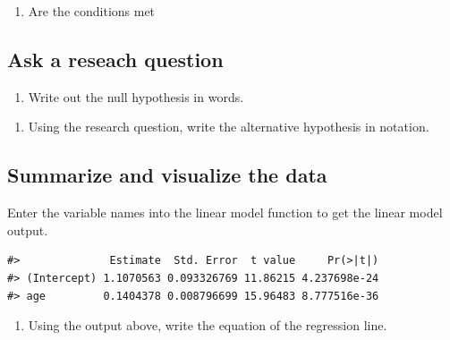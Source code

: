 \documentclass[
]{report}
\providecommand{\tightlist}{%
  \setlength{\itemsep}{0pt}\setlength{\parskip}{0pt}}
\begin{document}
\begin{enumerate}
\def\labelenumi{\arabic{enumi}.}
\setcounter{enumi}{4}
\tightlist
\item
  Are the conditions met
\end{enumerate}

\vspace{1in}

\hypertarget{ask-a-reseach-question}{%
\subsection{Ask a reseach question}\label{ask-a-reseach-question}}

\begin{enumerate}
\def\labelenumi{\arabic{enumi}.}
\setcounter{enumi}{5}
\tightlist
\item
  Write out the null hypothesis in words.
\end{enumerate}

\vspace{1in}

\begin{enumerate}
\def\labelenumi{\arabic{enumi}.}
\setcounter{enumi}{6}
\tightlist
\item
  Using the research question, write the alternative hypothesis in notation.
\end{enumerate}

\vspace{0.5in}

\hypertarget{summarize-and-visualize-the-data}{%
\subsection{Summarize and visualize the data}\label{summarize-and-visualize-the-data}}

Enter the variable names into the linear model function to get the linear model output.

\begin{verbatim}
#>              Estimate  Std. Error  t value     Pr(>|t|)
#> (Intercept) 1.1070563 0.093326769 11.86215 4.237698e-24
#> age         0.1404378 0.008796699 15.96483 8.777516e-36
\end{verbatim}

\begin{enumerate}
\def\labelenumi{\arabic{enumi}.}
\setcounter{enumi}{7}
\tightlist
\item
  Using the output above, write the equation of the regression line.
\end{enumerate}
\end{document}

